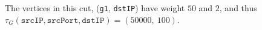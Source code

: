 The vertices in this cut, (\texttt{g1}, \texttt{dstIP}) have weight $50$ and $2$, and thus $\tau_G(\texttt{srcIP}, \texttt{srcPort}, \texttt{dstIP}) = (50000,\ 100)$.











